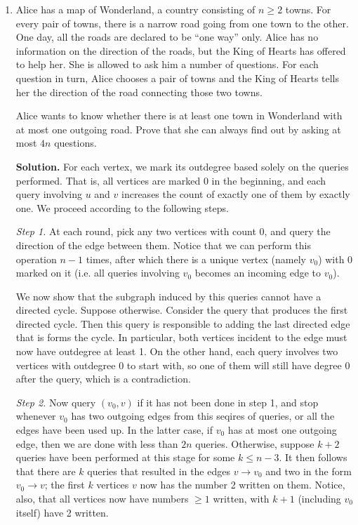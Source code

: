 \documentclass[11pt,a4paper]{article}
\begin{document}
\begin{enumerate}
	\item [\textbf{C8.}] Alice has a map of Wonderland, a country consisting of $n \geq 2$ towns. For every pair of towns, there is a narrow road going from one town to the other. One day, all the roads are declared to be “one way” only. Alice has no information on the direction of the roads, but the King of Hearts has offered to help her. She is allowed to ask him a number of questions. For each question in turn, Alice chooses a pair of towns and the King of Hearts tells her the direction of the road connecting those two towns.
	
	Alice wants to know whether there is at least one town in Wonderland with at most one outgoing road. Prove that she can always find out by asking at most $4n$ questions.
	
	\textbf{Solution.} 
	For each vertex, we mark its outdegree based solely on the queries performed. 
	That is, all vertices are marked 0 in the beginning, 
	and each query involving $u$ and $v$ increases the count of exactly one of them by exactly one. 
	We proceed according to the following steps. 
	
	\emph{Step 1.} 
	At each round, pick any two vertices with count 0, and query the direction of the edge between them. 
	Notice that we can perform this operation $n - 1$ times, after which there is a unique vertex (namely $v_0$) with 0 marked on it 
	(i.e. all queries involving $v_0$ becomes an incoming edge to $v_0$). 
	
	We now show that the subgraph induced by this queries cannot have a directed cycle. 
	Suppose otherwise. Consider the query that produces the first directed cycle. 
	Then this query is responsible to adding the last directed edge that is forms the cycle. 
	In particular, both vertices incident to the edge must now have outdegree at least 1. 
	On the other hand, each query involves two vertices with outdegree 0 to start with, 
	so one of them will still have degree 0 after the query, which is a contradiction. 
	
	
	\emph{Step 2.} 
	Now query $(v_0, v)$ if it has not been done in step 1, and stop whenever $v_0$ has two outgoing edges from this seqires of queries, 
	or all the edges have been used up. 
	In the latter case, if $v_0$ has at most one outgoing edge, then we are done with less than $2n$ queries. 
	Otherwise, suppose $k + 2$ queries have been performed at this stage for some $k\le n - 3$. 
	It then follows that there are $k$ queries that resulted in the edges $v\to v_0$ and two in the form $v_0\to v$; 
	the first $k$ vertices $v$ now has the number 2 written on them. 
	Notice, also, that all vertices now have numbers $\ge 1$ written, with $k+1$ (including $v_0$ itself) have 2 written. 
	

\end{enumerate}
\end{document}
